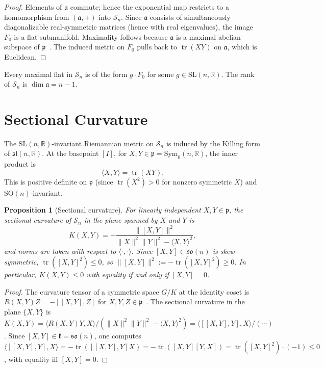 \documentclass[12pt]{article}
\newtheorem{proposition}[theorem]{Proposition}
\theoremstyle{definition}
\theoremstyle{remark}
\newcommand{\R}{\mathbb{R}}
\newcommand{\SL}{\mathrm{SL}}
\newcommand{\SO}{\mathrm{SO}}
\newcommand{\Symz}{\mathrm{Sym}_{0}}
\newcommand{\calM}{\mathcal{S}}
\newcommand{\tr}{\operatorname{tr}}
\begin{document}
\begin{proof}
Elements of $\mathfrak{a}$ commute; hence the exponential map
restricts to a homomorphism from $(\mathfrak{a}, +)$ into $\calM_n$.
Since $\mathfrak{a}$ consists of simultaneously diagonalizable
real-symmetric matrices (hence with real eigenvalues), the image
$F_0$ is a flat submanifold.
Maximality follows because $\mathfrak{a}$ is a maximal abelian
subspace of $\mathfrak{p}$~\cite[Ch.~V]{Helgason}.
The induced metric on $F_0$ pulls back to $\tr(XY)$ on $\mathfrak{a}$,
which is Euclidean.
\end{proof}

Every maximal flat in $\calM_n$ is of the form $g \cdot F_0$ for some
$g \in \SL(n,\R)$.
The rank of $\calM_n$ is $\dim \mathfrak{a} = n-1$.

\section{Sectional Curvature}
\label{sec:curvature}

The $\SL(n,\R)$-invariant Riemannian metric on $\calM_n$ is induced
by the Killing form of $\mathfrak{sl}(n,\R)$.
At the basepoint $[I]$, for $X, Y \in \mathfrak{p} = \Symz(n,\R)$,
the inner product is
\[
  \langle X, Y \rangle = \tr(XY).
\]
This is positive definite on $\mathfrak{p}$ (since $\tr(X^2) > 0$
for nonzero symmetric $X$) and $\SO(n)$-invariant.

\begin{proposition}[Sectional curvature]
\label{prop:curvature}
For linearly independent $X, Y \in \mathfrak{p}$, the sectional
curvature of $\calM_n$ in the plane spanned by $X$ and $Y$ is
\[
  K(X,Y) = -\frac{\|[X,Y]\|^2}{\|X\|^2\|Y\|^2 - \langle X,Y\rangle^2},
\]
and norms are taken with respect to $\langle\cdot,\cdot\rangle$.
Since $[X,Y] \in \mathfrak{so}(n)$ is skew-symmetric,
$\tr([X,Y]^2) \leq 0$, so $\|[X,Y]\|^2 := -\tr([X,Y]^2) \geq 0$.
In particular, $K(X,Y) \leq 0$ with equality if and only if
$[X,Y] = 0$.
\end{proposition}

\begin{proof}
The curvature tensor of a symmetric space $G/K$ at the identity coset
is $R(X,Y)Z = -[[X,Y],Z]$ for $X,Y,Z \in \mathfrak{p}$~\cite[Ch.~IV]{Helgason}.
The sectional curvature in the plane $\{X,Y\}$ is
$K(X,Y) = \langle R(X,Y)Y, X\rangle / (\|X\|^2\|Y\|^2 - \langle X,Y\rangle^2)
= \langle [[X,Y],Y], X\rangle / (\cdots)$.
Since $[X,Y] \in \mathfrak{k} = \mathfrak{so}(n)$, one computes
$\langle [[X,Y],Y],X\rangle = -\tr([[X,Y],Y]X) = -\tr([X,Y][Y,X])
= \tr([X,Y]^2) \cdot (-1) \leq 0$,
with equality iff $[X,Y] = 0$.
\end{proof}
\end{document}
